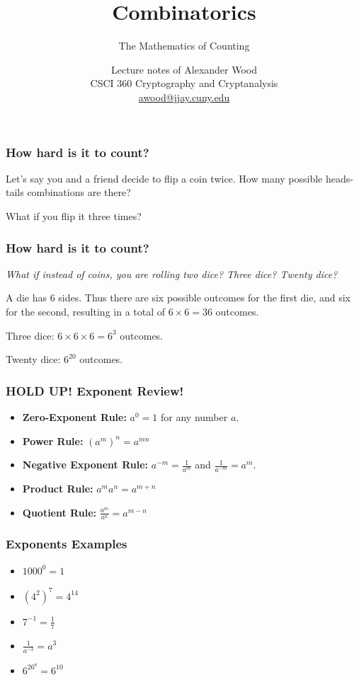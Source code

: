 \documentclass{beamer}
\title[OOP]{Combinatorics}
\subtitle{The Mathematics of Counting}
\author
{Lecture notes of Alexander Wood \\ CSCI 360 Cryptography and Cryptanalysis \\ \scriptsize \href{mailto:awood@jjay.cuny.edu}{awood@jjay.cuny.edu}}
\institute[JJay]{John Jay College of Criminal Justice}
\date{}
\newcommand{\<}{\langle}
\renewcommand{\>}{\rangle}
\begin{document}

\begin{frame}
  \titlepage
\end{frame}


\begin{frame}
\frametitle{How hard is it to count?}

Let's say you and a friend decide to flip a coin twice. How many possible heads-tails combinations are there?\newline

What if you flip it three times?
\end{frame}

\begin{frame}
\frametitle{How hard is it to count?}

\emph{What if instead of coins, you are rolling two dice? Three dice? Twenty dice?}\newline

\pause

A die has 6 sides. Thus there are six possible outcomes for the first die, and six for the second, resulting in a total of $6\times 6 = 36$ outcomes.\newline

Three dice: $6\times 6\times 6 = 6^3$ outcomes.\newline

Twenty dice: $6^{20}$ outcomes.
\end{frame}


\begin{frame}
\frametitle{HOLD UP! Exponent Review!}

\begin{itemize}
\item \textbf{Zero-Exponent Rule:} $a^0 = 1$ for any number $a$.
\item \textbf{Power Rule:} $(a^m)^n = a^{mn}$
\item \textbf{Negative Exponent Rule:} $a^{-m} = \frac{1}{a^m}$ and $\frac{1}{a^{-m}} = a^m$.
\item \textbf{Product Rule:} $a^ma^n = a^{m+n}$
\item \textbf{Quotient Rule:} $\frac{a^m}{a^n} = a^{m-n}$
\end{itemize}
\end{frame}

\begin{frame}
\frametitle{Exponents Examples}

\begin{itemize}
\item $1000^0 = 1$
\item $(4^2)^7 = 4^{14}$
\item $7^{-1} = \frac{1}{7}$
\item $\frac{1}{a^{-3}} = a^3$
\item $6^26^8 = 6^{10}$
\end{itemize}
\end{frame}
\end{document}
